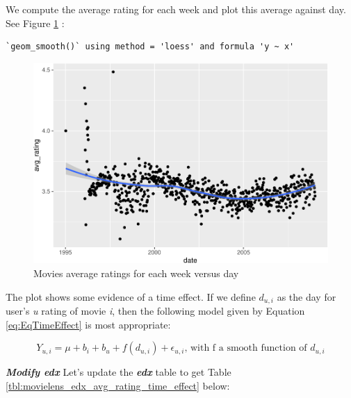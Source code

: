 \documentclass[
]{article}
\begin{document}
We compute the average rating for each week and plot this average
against day. See Figure
\ref{fig:movies_average_ratings_for_each_week_versus_day} :

\begin{verbatim}
`geom_smooth()` using method = 'loess' and formula 'y ~ x'
\end{verbatim}

\begin{figure}
\centering
\includegraphics{figures/rd_1-1.pdf}
\caption{Movies average ratings for each week versus
day\label{fig:movies_average_ratings_for_each_week_versus_day}}
\end{figure}

The plot shows some evidence of a time effect. If we define \(d_{u,i}\)
as the day for user's \emph{u} rating of movie \emph{i}, then the
following model given by Equation \ref{eq:EqTimeEffect} is most
appropriate:

%
\par

\label{eq:EqTimeEffect} \begin{equation}
Y_{u,i} = \mu + b_{i} + b_{u}  + f(d_{u,i})+ \epsilon_{u,i}\text{, with f a smooth function of }d_{u,i}
\end{equation}

\textbf{\emph{Modify edx}} Let's update the \textbf{\emph{edx}} table to
get Table \ref{tbl:movielens_edx_avg_rating_time_effect} below:
\end{document}
